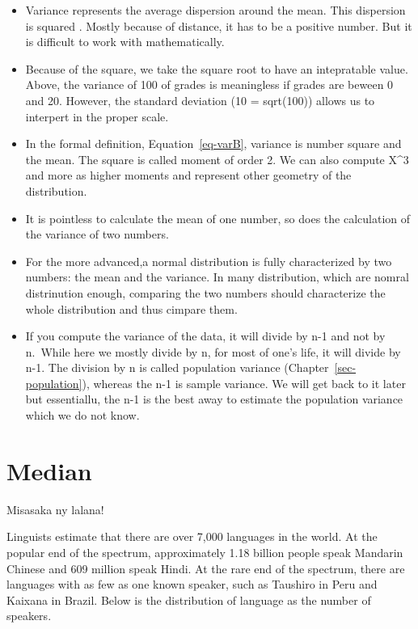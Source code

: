 \documentclass[
  letterpaper,
  DIV=11,
  numbers=noendperiod]{scrreprt}
\providecommand{\tightlist}{%
  \setlength{\itemsep}{0pt}\setlength{\parskip}{0pt}}
\begin{document}

\begin{itemize}
\tightlist
\item
  Variance represents the average dispersion around the mean. This
  dispersion is squared . Mostly because of distance, it has to be a
  positive number. But it is difficult to work with mathematically.
\item
  Because of the square, we take the square root to have an intepratable
  value. Above, the variance of 100 of grades is meaningless if grades
  are beween 0 and 20. However, the standard deviation (10 = sqrt(100))
  allows us to interpert in the proper scale.
\item
  In the formal definition, Equation~\ref{eq-varB}, variance is number
  square and the mean. The square is called moment of order 2. We can
  also compute X\^{}3 and more as higher moments and represent other
  geometry of the distribution.
\item
  It is pointless to calculate the mean of one number, so does the
  calculation of the variance of two numbers.
\item
  For the more advanced,a normal distribution is fully characterized by
  two numbers: the mean and the variance. In many distribution, which
  are nomral distrinution enough, comparing the two numbers should
  characterize the whole distribution and thus cimpare them.
\item
  If you compute the variance of the data, it will divide by n-1 and not
  by n.~While here we mostly divide by n, for most of one's life, it
  will divide by n-1. The division by n is called population variance
  (Chapter~\ref{sec-population}), whereas the n-1 is sample variance. We
  will get back to it later but essentiallu, the n-1 is the best away to
  estimate the population variance which we do not know.
\end{itemize}

\chapter{Median}\label{sec-median}

Misasaka ny lalana!

Linguists estimate that there are over 7,000 languages in the world. At
the popular end of the spectrum, approximately 1.18 billion people speak
Mandarin Chinese and 609 million speak Hindi. At the rare end of the
spectrum, there are languages with as few as one known speaker, such as
Taushiro in Peru and Kaixana in Brazil. Below is the distribution of
language as the number of speakers.
\end{document}

